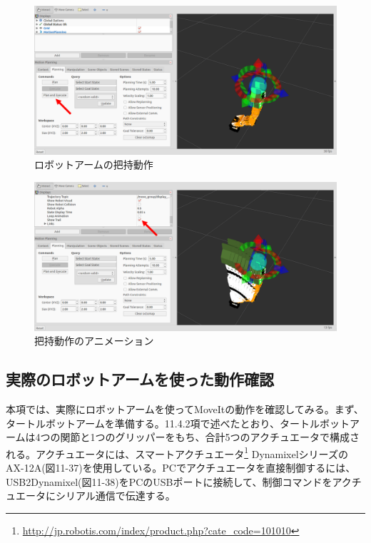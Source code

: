 \begin{figure}[htp]
  \centering
  \includegraphics[width=12cm]{pictures/chapter11/pic_11_35.png}
  \caption{ロボットアームの把持動作}
\end{figure}

\begin{figure}[htp]
  \centering
  \includegraphics[width=12cm]{pictures/chapter11/pic_11_36.png}
  \caption{把持動作のアニメーション}
\end{figure}

\subsection{実際のロボットアームを使った動作確認}

本項では、実際にロボットアームを使ってMoveItの動作を確認してみる。まず、タートルボットアームを準備する。11.4.2項で述べたとおり、タートルボットアームは4つの関節と1つのグリッパーをもち、合計5つのアクチュエータで構成される。アクチュエータには、スマートアクチュエータ\footnote{\url{http://jp.robotis.com/index/product.php?cate\_code=101010}} DynamixelシリーズのAX-12A(図11-37)を使用している。PCでアクチュエータを直接制御するには、USB2Dynamixel(図11-38)をPCのUSBポートに接続して、制御コマンドをアクチュエータにシリアル通信で伝達する。


